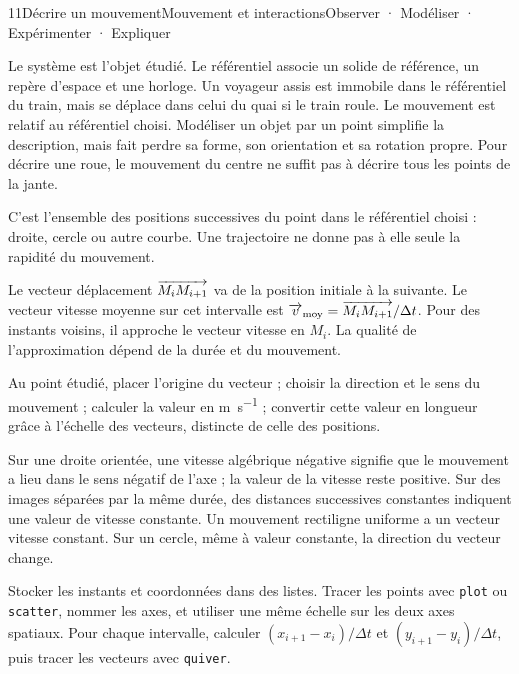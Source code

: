 \begin{ouverture}[mouvement]{11}{Décrire un mouvement}{Mouvement et interactions}{Observer · Modéliser · Expérimenter · Expliquer}
\end{ouverture}
\essentiel
{}
Le système est l'objet étudié. Le référentiel associe un solide de référence, un repère d'espace et une horloge. Un voyageur assis est immobile dans le référentiel du train, mais se déplace dans celui du quai si le train roule. Le mouvement est relatif au référentiel choisi.
Modéliser un objet par un point simplifie la description, mais fait perdre sa forme, son orientation et sa rotation propre. Pour décrire une roue, le mouvement du centre ne suffit pas à décrire tous les points de la jante.
\begin{definition}[Trajectoire]C'est l'ensemble des positions successives du point dans le référentiel choisi : droite, cercle ou autre courbe. Une trajectoire ne donne pas à elle seule la rapidité du mouvement.\end{definition}
Le vecteur déplacement $\overrightarrow{M_iM_{i+1}}$ va de la position initiale à la suivante. Le vecteur vitesse moyenne sur cet intervalle est $\overrightarrow{v}_{\mathrm{moy}}=\overrightarrow{M_iM_{i+1}}/\Delta t$. Pour des instants voisins, il approche le vecteur vitesse en $M_i$. La qualité de l'approximation dépend de la durée et du mouvement.
\begin{savoirfaire}Au point étudié, placer l'origine du vecteur ; choisir la direction et le sens du mouvement ; calculer la valeur en \unit{m.s^{-1}} ; convertir cette valeur en longueur grâce à l'échelle des vecteurs, distincte de celle des positions.\end{savoirfaire}
Sur une droite orientée, une vitesse algébrique négative signifie que le mouvement a lieu dans le sens négatif de l'axe ; la valeur de la vitesse reste positive.
Sur des images séparées par la même durée, des distances successives constantes indiquent une valeur de vitesse constante. Un mouvement rectiligne uniforme a un vecteur vitesse constant. Sur un cercle, même à valeur constante, la direction du vecteur change.
\begin{savoirfaire}Stocker les instants et coordonnées dans des listes. Tracer les points avec \texttt{plot} ou \texttt{scatter}, nommer les axes, et utiliser une même échelle sur les deux axes spatiaux. Pour chaque intervalle, calculer $(x_{i+1}-x_i)/\Delta t$ et $(y_{i+1}-y_i)/\Delta t$, puis tracer les vecteurs avec \texttt{quiver}.\end{savoirfaire}
